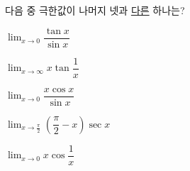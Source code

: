 다음 중 극한값이 나머지 넷과 \underline{다른} 하나는?
\begin{choicesii}{\rule[-3ex]{0pt}{8ex}$\displaystyle\lim_{x\to 0}\dfrac{\tan x}{\sin x}$}{\rule[-3ex]{0pt}{8ex}$\displaystyle\lim_{x\to\infty}x\tan\dfrac{1}{x}$}{\rule[-3ex]{0pt}{8ex}$\displaystyle\lim_{x\to 0}\dfrac{x\cos x}{\sin x}$}{\rule[-3ex]{0pt}{8ex}$\displaystyle\lim_{x\to\frac{\pi}{2}}\left(\dfrac{\pi}{2}-x\right)\sec x$}{\rule[-3ex]{0pt}{8ex}$\displaystyle\lim_{x\to 0}x\cos\dfrac{1}{x}$}\end{choicesii}
